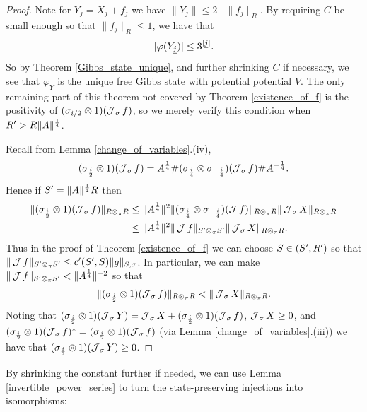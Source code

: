 \begin{proof}
Note for $Y_j=X_j+f_j$ we have $\|Y_j\|\leq 2 +\|f_j\|_R$. By requiring $C$ be small enough so that $\|f_j\|_R\leq 1$, we have that
	\begin{align*}
		|\varphi(Y_{\underline{j}})|\leq 3^{|\underline{j}|}.
	\end{align*}
So by Theorem \ref{Gibbs_state_unique}, and further shrinking $C$ if necessary, we see that $\varphi_Y$ is the unique free Gibbs state with potential potential $V$.
The only remaining part of this theorem not covered by Theorem \ref{existence_of_f} is the positivity of $(\sigma_{i/2}\otimes 1)(\operatorname{\mathcal J}_\sigma f)$, so we merely verify this condition when $R\rq{}>R\|A\|^\frac{1}{4}$.\par
Recall from Lemma \ref{change_of_variables}.(iv),
	\begin{align*}
		(\sigma_\frac{i}{2}\otimes 1)(\operatorname{\mathcal J}_\sigma f) = A^\frac{1}{4}\#(\sigma_\frac{i}{4}\otimes \sigma_{-\frac{i}{4}})(\operatorname{\mathcal J}_\sigma f)\# A^{-\frac{1}{4}}.
	\end{align*}
Hence if $S\rq{}=\|A\|^\frac{1}{4} R$ then
	\begin{align*}
		\| (\sigma_\frac{i}{2}\otimes 1)(\J_\sigma f)\|_{R\otimes_\pi R} &\leq \|A^\frac{1}{4}\|^2  \| (\sigma_\frac{i}{4}\otimes \sigma_{-\frac{i}{4}})(\J f)\|_{R\otimes_\pi R} \|\J_\sigma X\|_{R\otimes_\pi R}\\
				& \leq \|A^\frac{1}{4}\|^2 \| \J f\|_{S\rq{}\otimes_\pi S\rq{}} \|\J_\sigma X\|_{R\otimes_\pi R}.
	\end{align*}
Thus in the proof of Theorem \ref{existence_of_f} we can choose $S\in (S\rq{}, R\rq{})$ so that $\|\J f\|_{S\rq{}\otimes_\pi S\rq{}} \leq c\rq{}(S\rq{},S)\|g\|_{S,\sigma}$. In particular, we can make $\|\J f\|_{S\rq{}\otimes_\pi S\rq{}} < \|A^\frac{1}{4}\|^{-2}$ so that
	\begin{align*}
		\|(\sigma_\frac{i}{2}\otimes 1)(\operatorname{\mathcal J}_\sigma f)\|_{R\otimes_\pi R} < \|\operatorname{\mathcal J}_\sigma X\|_{R\otimes_\pi R}.
	\end{align*}
Noting that $(\sigma_\frac{i}{2}\otimes 1)(\operatorname{\mathcal J}_\sigma Y)=\operatorname{\mathcal J}_\sigma X+ (\sigma_\frac{i}{2}\otimes 1)(\operatorname{\mathcal J}_\sigma f)$, $\operatorname{\mathcal J}_\sigma X\geq 0$, and $(\sigma_\frac{i}{2}\otimes 1)(\operatorname{\mathcal J}_\sigma f)^*=(\sigma_\frac{i}{2}\otimes 1)(\operatorname{\mathcal J}_\sigma f)$ (via Lemma \ref{change_of_variables}.(iii)) we have that $(\sigma_\frac{i}{2}\otimes 1)(\operatorname{\mathcal J}_\sigma Y)\geq 0$.
\end{proof}

By shrinking the constant further if needed, we can use Lemma \ref{invertible_power_series} to turn the state-preserving injections into isomorphisms:

